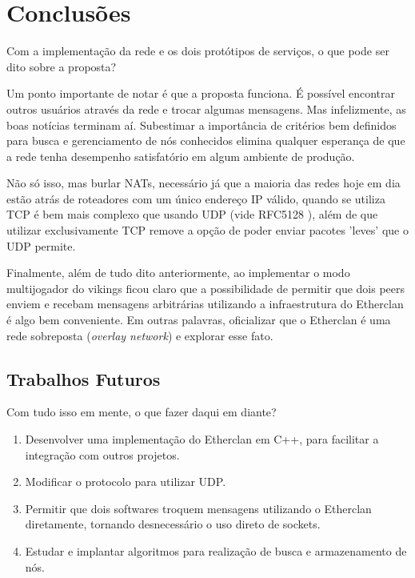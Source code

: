 \chapter{Conclusões}
\label{sec:conclusoes}

Com a implementação da rede e os dois protótipos de serviços, o que pode ser dito sobre a proposta?

Um ponto importante de notar é que a proposta funciona. É possível encontrar outros usuários
através da rede e trocar algumas mensagens. Mas infelizmente, as boas notícias terminam aí.
Subestimar a importância de critérios bem definidos para busca e gerenciamento de nós conhecidos
elimina qualquer esperança de que a rede tenha desempenho satisfatório em algum ambiente de
produção. 

Não só isso, mas burlar NATs, necessário já que a maioria das redes hoje em dia estão atrás de
roteadores com um único endereço IP válido, quando se utiliza TCP é bem mais complexo que usando
UDP (vide RFC5128 \cite{rfc5128}), além de que utilizar exclusivamente TCP remove a opção de poder
enviar pacotes 'leves' que o UDP permite.

Finalmente, além de tudo dito anteriormente, ao implementar o modo multijogador do vikings ficou
claro que a possibilidade de permitir que dois peers enviem e recebam mensagens arbitrárias
utilizando a infraestrutura do Etherclan é algo bem conveniente. Em outras palavras, oficializar
que o Etherclan é uma rede sobreposta (\textit{overlay network}) e explorar esse fato.

\section{Trabalhos Futuros}
\label{sec:conclusoes:futuro}

  Com tudo isso em mente, o que fazer daqui em diante?

  \begin{enumerate}
    \item Desenvolver uma implementação do Etherclan em C++, para facilitar a integração com outros
      projetos.
    \item Modificar o protocolo para utilizar UDP.
    \item Permitir que dois softwares troquem mensagens utilizando o Etherclan diretamente, tornando
      desnecessário o uso direto de sockets.
    \item Estudar e implantar algoritmos para realização de busca e armazenamento de nós.
  \end{enumerate}